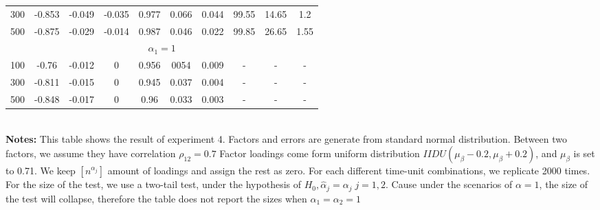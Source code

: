 \begin{table}[]
\begin{tabular}{lccccccccc}
\multicolumn{1}{l|}{300} & -0.853 & -0.049 & \multicolumn{1}{c|}{-0.035} & 0.977 & 0.066 & \multicolumn{1}{c|}{0.044} & 99.55       & 14.65      & 1.2        \\
\multicolumn{1}{l|}{500} & -0.875 & -0.029 & \multicolumn{1}{c|}{-0.014} & 0.987 & 0.046 & \multicolumn{1}{c|}{0.022} & 99.85       & 26.65      & 1.55       \\ \hline
\multicolumn{10}{c}{$\alpha_1=1$}                                                                                                                             \\ \hline
\multicolumn{1}{l|}{100} & -0.76  & -0.012 & \multicolumn{1}{c|}{0}      & 0.956 & 0054  & \multicolumn{1}{c|}{0.009} & -           & -          & -          \\
\multicolumn{1}{l|}{300} & -0.811 & -0.015 & \multicolumn{1}{c|}{0}      & 0.945 & 0.037 & \multicolumn{1}{c|}{0.004} & -           & -          & -          \\
\multicolumn{1}{l|}{500} & -0.848 & -0.017 & \multicolumn{1}{c|}{0}      & 0.96  & 0.033 & \multicolumn{1}{c|}{0.003} & -           & -          & -          \\ \hline
\hline
	\end{tabular}
	\bigskip \\
	{\bf Notes:}
	This table shows the result of  experiment 4.
	Factors and errors are generate from standard normal distribution.
	Between two factors, we assume they have correlation $\rho_{12} = 0.7$
	Factor loadings come form uniform distribution $IIDU(\mu_{\beta} - 0.2, \mu_{\beta}+0.2)$, and $\mu_{\beta}$ is set to 0.71.
	We keep  $[n^{\alpha_{j}}]$ amount of loadings and assign the rest as zero.
	For each different time-unit combinations, we replicate 2000 times.
	For the size of the test, we use a two-tail test, under the hypothesis of $H_0, \hat{\alpha}_j = \alpha_j\; j=1,2$.
	Cause under the scenarios of $\alpha = 1$, the size of the test will collapse, therefore the table does not report the sizes when $\alpha_1 = \alpha_2 = 1$
\end{table}


%